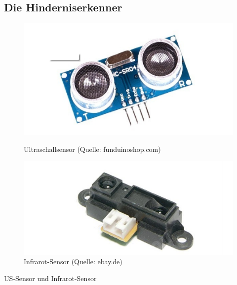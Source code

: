 \subsection{Die Hinderniserkenner}
\begin{figure}[htb]
	\centering
	\begin{minipage}{0.45\linewidth}
		\centering
		\includegraphics[scale=0.5]{images/Bild-1-1.png}
		\caption{Ultraschallsensor \newline(Quelle: funduinoshop.com)}
		\label{bild_1.2}
	\end{minipage}
	\begin{minipage}{0.45\linewidth}
		\centering
		\includegraphics[scale=0.5]{images/infrarot.png}
		\caption{Infrarot-Sensor \newline (Quelle: ebay.de)}
	\end{minipage}
\end{figure}
US-Sensor und Infrarot-Sensor
